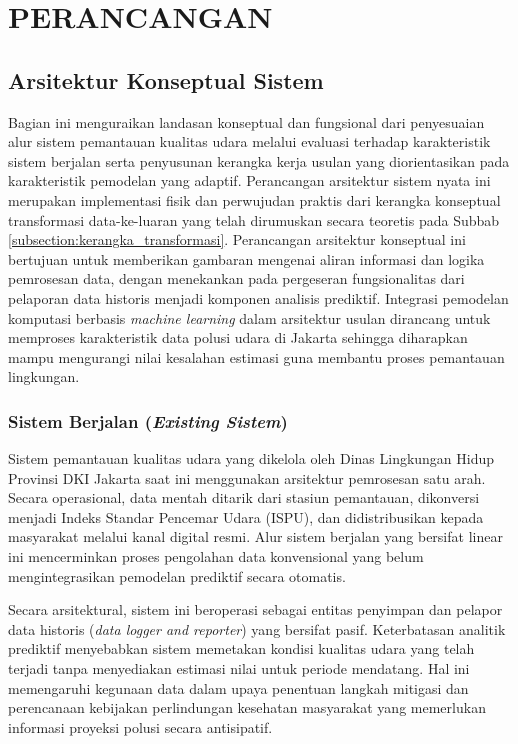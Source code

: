 \cleardoublepage
\chapter{PERANCANGAN}
\label{chap:perancangan}

\section{Arsitektur Konseptual Sistem}

Bagian ini menguraikan landasan konseptual dan fungsional dari penyesuaian alur sistem pemantauan kualitas udara melalui evaluasi terhadap karakteristik sistem berjalan serta penyusunan kerangka kerja usulan yang diorientasikan pada karakteristik pemodelan yang adaptif. {Perancangan arsitektur sistem nyata ini merupakan implementasi fisik dan perwujudan praktis dari kerangka konseptual transformasi data-ke-luaran yang telah dirumuskan secara teoretis pada Subbab \ref{subsection:kerangka_transformasi}.} Perancangan arsitektur konseptual ini bertujuan untuk memberikan gambaran mengenai aliran informasi dan logika pemrosesan data, dengan menekankan pada pergeseran fungsionalitas dari pelaporan data historis menjadi komponen analisis prediktif. Integrasi pemodelan komputasi berbasis \textit{machine learning} dalam arsitektur usulan dirancang untuk memproses karakteristik data polusi udara di Jakarta sehingga diharapkan mampu mengurangi nilai kesalahan estimasi guna membantu proses pemantauan lingkungan.

\subsection{Sistem Berjalan (\textit{Existing Sistem})}

Sistem pemantauan kualitas udara yang dikelola oleh Dinas Lingkungan Hidup Provinsi DKI Jakarta saat ini menggunakan arsitektur pemrosesan satu arah. Secara operasional, data mentah ditarik dari stasiun pemantauan, dikonversi menjadi Indeks Standar Pencemar Udara (ISPU), dan didistribusikan kepada masyarakat melalui kanal digital resmi. Alur sistem berjalan yang bersifat linear ini mencerminkan proses pengolahan data konvensional yang belum mengintegrasikan pemodelan prediktif secara otomatis.

Secara arsitektural, sistem ini beroperasi sebagai entitas penyimpan dan pelapor data historis (\textit{data logger and reporter}) yang bersifat pasif. Keterbatasan analitik prediktif menyebabkan sistem memetakan kondisi kualitas udara yang telah terjadi tanpa menyediakan estimasi nilai untuk periode mendatang. Hal ini memengaruhi kegunaan data dalam upaya penentuan langkah mitigasi dan perencanaan kebijakan perlindungan kesehatan masyarakat yang memerlukan informasi proyeksi polusi secara antisipatif.


